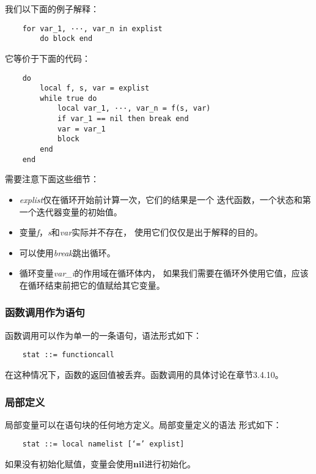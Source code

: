 \documentclass{ctexart}
\begin{document}
我们以下面的例子解释：

\lstset{language=C}
\begin{lstlisting}
	for var_1, ···, var_n in explist
		do block end
\end{lstlisting}

它等价于下面的代码：

\lstset{language=C}
\begin{lstlisting}
	do
		local f, s, var = explist
		while true do
			local var_1, ···, var_n = f(s, var)
			if var_1 == nil then break end
			var = var_1
			block
		end
	end
\end{lstlisting}

需要注意下面这些细节：

\begin{itemize}
	\item \emph{explist}仅在循环开始前计算一次，它们的结果是一个
	迭代函数，一个状态和第一个迭代器变量的初始值。
	\item 变量\emph{f}，\emph{s}和\emph{var}实际并不存在，
	使用它们仅仅是出于解释的目的。
	\item 可以使用\emph{break}跳出循环。
	\item 循环变量\emph{var\_i}的作用域在循环体内，
	如果我们需要在循环外使用它值，应该在循环结束前把它的值赋给其它变量。
\end{itemize}

\subsubsection{函数调用作为语句}

函数调用可以作为单一的一条语句，语法形式如下：

\lstset{language=C}
\begin{lstlisting}
	stat ::= functioncall
\end{lstlisting}

在这种情况下，函数的返回值被丢弃。函数调用的具体讨论在章节3.4.10。

\subsubsection{局部定义}

局部变量可以在语句块的任何地方定义。局部变量定义的语法
形式如下：

\lstset{language=C}
\begin{lstlisting}
	stat ::= local namelist [‘=’ explist]
\end{lstlisting}

如果没有初始化赋值，变量会使用\textbf{nil}进行初始化。
\end{document}
